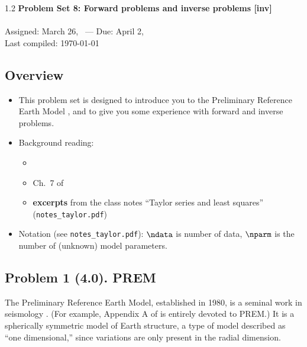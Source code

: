 \documentclass[11pt,titlepage,fleqn]{article}
\begin{document}

\begin{spacing}{1.2}
\centering
{\large \bf Problem Set 8: Forward problems and inverse problems [inv]} \\
\cltag\ \\
Assigned: March 26, \cyear\ --- Due: April 2, \cyear\ \\
Last compiled: \today
\end{spacing}


\subsection*{Overview}

\begin{itemize}
\item This problem set is designed to introduce you to the Preliminary Reference Earth Model \citep{PREM}, and to give you some experience with forward and inverse problems.

\item Background reading:
%
\begin{itemize}
\item \citet{PREM}
\item Ch.~7 of \citet{SteinWysession}
\item {\bf excerpts} from the class notes ``Taylor series and least squares'' (\verb+notes_taylor.pdf+)
\end{itemize}


\item Notation (see \verb+notes_taylor.pdf+): $\ndata$ is number of data, $\nparm$ is the number of (unknown) model parameters.

\end{itemize}


\subsection*{Problem 1 (4.0). PREM}

The Preliminary Reference Earth Model, established in 1980, is a seminal work in seismology \citep{PREM}. (For example, Appendix A of \citet{ShearerE2} is entirely devoted to PREM.) It is a spherically symmetric model of Earth structure, a type of model described as ``one dimensional,'' since variations are only present in the radial dimension.
\end{document}
